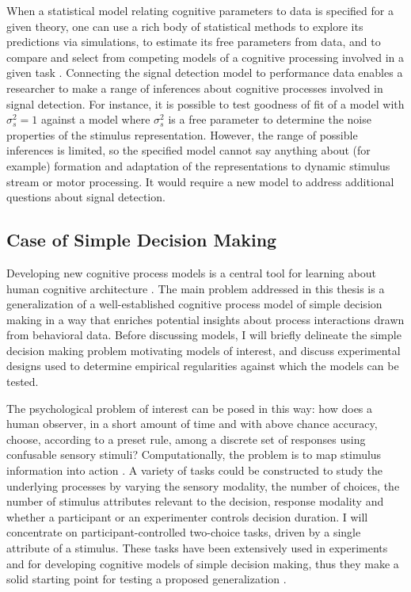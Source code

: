 \documentclass[12pt]{article}
\begin{document}
When a statistical model relating cognitive parameters to
data is specified for a given theory, one can use a rich body of
statistical methods to explore its predictions via simulations, to estimate
its free parameters from data, and to compare and select from
competing models of a cognitive processing involved in a given task
\citep{Ber1997,CasBer2002,GelCar2013}. Connecting the signal detection
model to performance data enables a researcher to make a range of
inferences about cognitive processes involved in signal detection. For
instance, it is possible to test goodness of fit of a model with
$\sigma_s^2 = 1$ against a model where $\sigma_s^2$ is a free parameter to
determine the noise properties of the stimulus
representation. However, the range of possible inferences is limited, so
the specified model cannot say anything about (for example) formation and
adaptation of the representations to dynamic stimulus stream or motor processing. It would require a new model to address additional questions about signal
detection.


\subsection{Case of Simple Decision Making}

Developing new cognitive process models is a central tool for learning
about human cognitive architecture
\citep{BusDie2010,LewFar2010,LeeWag2014}. The main problem addressed in
this thesis is a generalization of a well-established cognitive process
model of simple decision making in a way that enriches potential insights
about process interactions drawn from behavioral data. Before discussing
models, I will briefly delineate the simple decision making problem
motivating models of interest, and discuss experimental designs used to
determine empirical regularities against which the models can be tested.
    
The psychological problem of interest can be posed in this way: how does a
human observer, in a short amount of time and with above chance accuracy,
choose, according to a preset rule, among a discrete set of responses using
confusable sensory stimuli? Computationally, the problem is to map stimulus
information into action \citep{Vic1979,BogBro2006}. A variety of tasks
could be constructed to study the underlying processes by varying
the sensory modality, the number of choices, the number of stimulus
attributes relevant to the decision, response modality and whether a
participant or an experimenter controls decision duration. I will concentrate
on participant-controlled two-choice tasks, driven by a
single attribute of a stimulus. These tasks have been extensively
used in experiments and for developing cognitive models of simple decision
making, thus they make a solid starting point for testing a proposed generalization
\citep{Luc1986,RatSmi2004,RatMck2008,Wag2009}.
    
\end{document}
